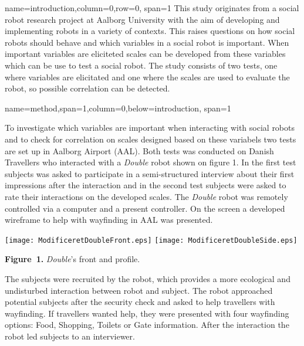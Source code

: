 \documentclass[paperwidth=160cm,paperheight=100cm,landscape,fontscale=0.3010]{baposter}
\begin{document}
\begin{poster}
{name=introduction,column=0,row=0, span=1}
{\parskip 5pt   
This study originates from a social robot research project at Aalborg University with the aim of developing and implementing robots in a variety of contexts. This raises questions on how social robots should behave and which variables in a social robot is important. When important variables are eliciteted scales can be developed from these variables which can be use to test a social robot. The study consists of two tests, one where variables are elicitated and one where the scales are used to evaluate the robot, so possible correlation can be detected.  
}

{name=method,span=1,column=0,below=introduction, span=1}
{\parskip 5pt 
To investigate which variables are important when interacting with social robots and to check for correlation on scales designed based on these variabels two tests are set up in Aalborg Airport (AAL). Both tests was conducted on Danish Travellers who interacted with a \textit{Double} robot shown on figure 1. In the first test subjects was asked to participate in a semi-structured interview about their first impressions after the interaction and in the second test subjects were asked to rate their interactions on the developed scales. The \textit{Double} robot was remotely controlled via a computer and a present controller. On the screen a developed wireframe to help with wayfinding in AAL was presented. 
\vspace{-10pt}  

\begin{center}
\texttt{[image: ModificeretDoubleFront.eps]}
\texttt{[image: ModificeretDoubleSide.eps]}

\textbf{Figure~1. }\textit{Double}'s front and profile.
\end{center}
\vspace{-10pt}  

The subjects were recruited by the robot, which provides a more ecological and undisturbed interaction between robot and subject. The robot approached potential subjects after the security check and asked to help travellers with wayfinding. If travellers wanted help, they were presented with four wayfinding options: Food, Shopping, Toilets or Gate information. After the interaction the robot led subjects to an interviewer. 

}
\end{poster}
\end{document}
